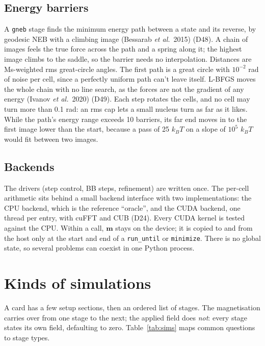 \documentclass[10pt,a4paper]{article}
\newcommand{\code}[1]{\texttt{#1}}
\newcommand{\vm}{\mathbf{m}}
\newcommand{\dec}[1]{\textcolor{comment}{\small(#1)}}
\begin{document}
\subsection{Energy barriers}
A \code{gneb} stage finds the minimum energy path between a state and its reverse, by geodesic NEB with a climbing image
(Bessarab \emph{et al.}\ 2015) \cite{bessarab} \dec{D48}. A chain of images feels the true force across the path and a spring along it;
the highest image climbs to the saddle, so the barrier needs no interpolation. Distances are Ms-weighted rms great-circle
angles. The first path is a great circle with $10^{-2}$ rad of noise per cell, since a perfectly uniform path can't
leave itself. L-BFGS moves the whole chain with no line search, as the forces are not the gradient of any energy
(Ivanov \emph{et al.}\ 2020) \cite{ivanov} \dec{D49}. Each step rotates the cells, and no cell may turn more than 0.1 rad: an rms cap
lets a small nucleus turn as far as it likes. While the path's energy range exceeds 10 barriers, its far end moves in to
the first image lower than the start, because a pass of 25 $k_BT$ on a slope of $10^5$ $k_BT$ would fit between two
images.

\subsection{Backends}
The drivers (step control, BB steps, refinement) are written once. The per-cell arithmetic sits behind a small backend
interface with two implementations: the CPU backend, which is the reference ``oracle'', and the CUDA backend, one thread
per entry, with cuFFT and CUB \dec{D24}. Every CUDA kernel is tested against the CPU. Within a call, $\vm$ stays on the
device; it is copied to and from the host only at the start and end of a \code{run\_until} or \code{minimize}. There is
no global state, so several problems can coexist in one Python process.

\section{Kinds of simulations}

A card has a few setup sections, then an ordered list of stages. The magnetisation carries over from one stage to the
next; the applied field does \emph{not}: every stage states its own field, defaulting to zero. Table~\ref{tab:sims} maps
common questions to stage types.
\end{document}
